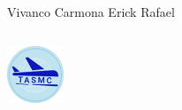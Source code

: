 \documentclass[12pt]{beamer}
\begin{document}
\begin{frame}
\begin{columns}
\begin{column}{6cm}
			Vivanco Carmona Erick Rafael
		\end{column} 
	\end{columns}	
	
		\begin{center}
		\includegraphics[height=1.7cm]{imagenes/logo.png}
	\end{center}		
\end{frame}
	
\end{document}
